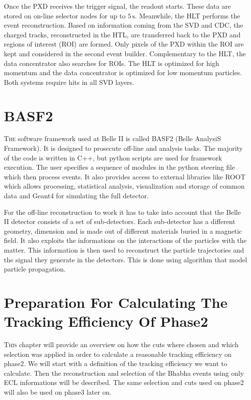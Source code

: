 \documentclass[a4paper,11pt,twosided,final,german,openbib,pdftex,listof=totoc,bibliography=totoc]{scrbook}
\begin{document}
Once the PXD receives the trigger signal, the readout starts. These data are stored on on-line selector nodes for up to $5\,\textrm{s}$. Meanwhile, the HLT performs the event reconstruction. Based on information coming from the SVD and CDC, the charged tracks, reconstructed in the HTL, are transferred back to the PXD and regions of interest (ROI) are formed. Only pixels of the PXD within the ROI are kept and considered in the second event builder. Complementary to the HLT, the data concentrator also searches for ROIs. The HLT is optimized for high momentum and the data concentrator is optimized for low momentum particles. Both systems require hits in all SVD layers. \cite{B2TR}


\chapter{BASF2}
\label{sec:Tools}

\lettrine{T}{he} software framework used at Belle II is called BASF2 (Belle AnalysiS Framework). It is designed to prosecute off-line and analysis tasks. The majority of the code is written in C++, but python scripts are used for framework execution. The user specifies a sequence of modules in the python steering file which then process events. It also provides access to external libraries like ROOT which allows processing, statistical analysis, visualization and storage of common data and Geant4 for simulating the full detector.\cite{Moll_2011}


For the off-line reconstruction to work it has to take into account that the Belle II detector consists of a set of sub-detectors. Each sub-detector has a different geometry, dimension and is made out of different materials buried in a magnetic field. It also exploits the informations on the interactions of the particles with the matter. This information is then used to reconstruct the particle trajectories and the signal they generate in the detectors. This is done using algorithm that model particle propagation.

\chapter{Preparation  For Calculating The Tracking Efficiency Of Phase2}
\label{chap:Phase2Eff}

\lettrine{T}{his} chapter will provide an overview on how the cuts where chosen and which selection was applied in order to calculate a reasonable tracking efficiency on phase2. We will start with a definition of the tracking efficiency we want to calculate. Then the reconstruction and selection of the Bhabha events using only ECL informations will be described. The same selection and cuts used on phase2 will also be used on phase3 later on.
\end{document}
